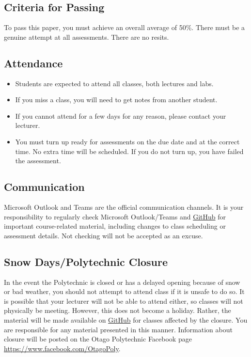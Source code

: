 \documentclass{article}
\begin{document}
\subsection*{Criteria for Passing}
To pass this paper, you must achieve an overall average of 50\%. There must be a genuine attempt at all assessments. There are no resits.

\subsection*{Attendance}
\begin{itemize}
	\item Students are expected to attend all classes, both lectures and labs.
	\item If you miss a class, you will need to get notes from another student.
	\item If you cannot attend for a few days for any reason, please contact your lecturer.
	\item You must turn up ready for assessments on the due date and at the correct time. No extra time will be scheduled. If you do not turn up, you have failed the assessment.
\end{itemize}

\subsection*{Communication}
Microsoft Outlook and Teams are the official communication channels. It is your responsibility to regularly check Microsoft Outlook/Teams and \href{https://github.com/Grayson-Orr/course-materials}{GitHub} for important course-related material, including changes to class scheduling or assessment details. Not checking will not be accepted as an excuse.

\subsection*{Snow Days/Polytechnic Closure}
In the event the Polytechnic is closed or has a delayed opening because of snow or bad weather, you should not attempt to attend class if it is unsafe to do so. It is possible that your lecturer will not be able to attend either, so classes will not physically be meeting. However, this does not become a holiday. Rather, the material will be made available on \href{https://github.com/Grayson-Orr/course-materials}{GitHub} for classes affected by the closure. You are responsible for any material presented in this manner. Information about closure will be posted on the Otago Polytechnic Facebook page \href{https://www.facebook.com/OtagoPoly}{https://www.facebook.com/OtagoPoly}.
\end{document}
